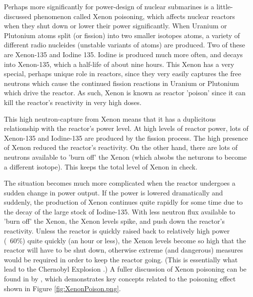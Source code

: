 \documentclass{article}\usepackage[]{graphicx}\usepackage[]{color}
\begin{document}
Perhaps more significantly for power-design of nuclear submarines is a little-discussed phenomenon called Xenon poisoning, which affects nuclear reactors when they shut down or lower their power significantly. When Uranium or Plutonium atoms split (or fission) into two smaller isotopes atoms, a variety of different radio nucleides (unstable variants of atoms) are produced.  Two of these are Xenon-135 and Iodine 135.  Iodine is produced much more often, and decays into Xenon-135, which a half-life of about nine hours.  This Xenon has a very special, perhaps unique role in reactors, since they very easily captures the free neutrons which cause the continued fission reactions in Uranium or Plutonium which drive the reactor.  As such, Xenon is known as reactor 'poison' since it can kill the reactor's reactivity in very high doses.

This high neutron-capture from Xenon means that it has a duplicitous relationship with the reactor's power level.  At high levels of reactor power, lots of Xenon-135 and Iodine-135 are produced by the fission process.  The high presence of Xenon reduced the reactor's reactivity.  On the other hand, there are lots of neutrons available to 'burn off' the Xenon (which absobs the neturons to become a different isotope).  This keeps the total level of Xenon in check.

The situation becomes much more complicated when the reactor undergoes a sudden change in power output.  If the power is lowered dramatically and suddenly, the production of Xenon continues quite rapidly for some time due to the decay of the large stock of Iodine-135.  With less neutron flux available to 'burn off' the Xenon, the Xenon levels spike, and push down the reactor's reactivity.  Unless the reactor is quickly raised back to relatively high power (~60\%) quite quickly (an hour or less), the Xenon levels become so high that the reactor will have to be shut down, otherwise extreme (and dangerous) measures would be required in order to keep the reactor going.  (This is essentially what lead to the Chernobyl Explosion \parencite{WNA2009}.)  A fuller discussion of Xenon poisoning can be found in   by \citeauthor{garland2005}, which demonstrates key concepts related to the poisoning effect shown in Figure \ref{fig:XenonPoison.png}.
\end{document}
